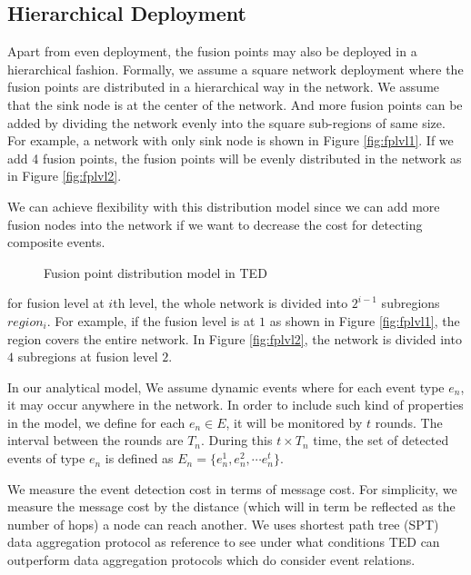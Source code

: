 \subsection{Hierarchical Deployment}
Apart from even deployment, the fusion points may also be deployed in a hierarchical fashion. Formally, we assume a square network deployment where the fusion points are distributed in a hierarchical way in the network. We assume that the sink node is at the center of the network. And more fusion points can be added by dividing the network evenly into the square sub-regions of same size. For example, a network with only sink node is shown in Figure \ref{fig:fplvl1}. If we add 4 fusion points, the fusion points will be evenly distributed in the network as in Figure \ref{fig:fplvl2}.

We can achieve flexibility with this distribution model since we can add more fusion nodes into the network if we want to decrease the cost for detecting composite events.

\begin{figure}
\centering
{}
\caption{Fusion point distribution model in TED}
\label{fig:fplvl1-2}
\end{figure}

for fusion level at \(i\)th level, the whole network is divided into \(2^{i-1}\) subregions \(region_i\). For example, if the fusion level is at \(1\) as shown in Figure \ref{fig:fplvl1}, the region covers the entire network. In Figure \ref{fig:fplvl2}, the network is divided into \(4\) subregions at fusion level \(2\).

In our analytical model, We assume dynamic events where for each event type \(e_n\), it may occur anywhere in the network. In order to include such kind of properties in the model, we define for each \(e_n \in E\), it will be monitored by \(t\) rounds. The interval between the rounds are \(T_n\). During this \(t\times T_n\) time, the set of detected events of type \(e_n\) is defined as \(E_n=\{e_n^1, e_n^2, \cdots e_n^t\}\).

We measure the event detection cost in terms of message cost. For simplicity, we measure the message cost by the distance (which will in term be reflected as the number of hops) a node can reach another. We uses shortest path tree (SPT) data aggregation protocol \cite{impactaggregation} as reference to see under what conditions TED can outperform data aggregation protocols which do consider event relations.

